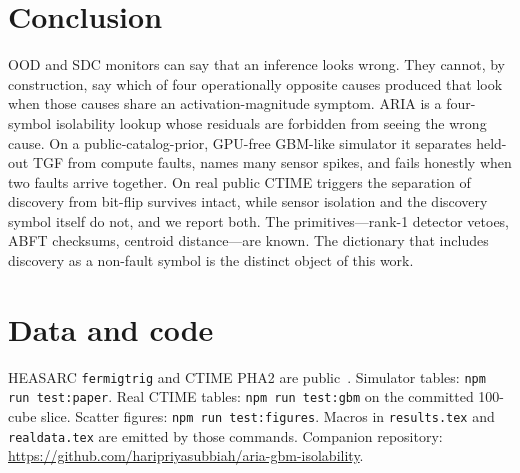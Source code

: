 \documentclass[journal]{IEEEtran}
\begin{document}
\section{Conclusion}

OOD and SDC monitors can say that an inference looks wrong. They cannot, by construction, say which of four operationally opposite causes produced that look when those causes share an activation-magnitude symptom. ARIA is a four-symbol isolability lookup whose residuals are forbidden from seeing the wrong cause. On a public-catalog-prior, GPU-free GBM-like simulator it separates held-out TGF from compute faults, names many sensor spikes, and fails honestly when two faults arrive together. On \RealCubes{} real public CTIME triggers the separation of discovery from bit-flip survives intact, while sensor isolation and the discovery symbol itself do not, and we report both. The primitives---rank-1 detector vetoes, ABFT checksums, centroid distance---are known. The dictionary that includes discovery as a non-fault symbol is the distinct object of this work.

\section*{Data and code}
HEASARC \texttt{fermigtrig} and CTIME PHA2 are public~\cite{meegan2009,vonkienlin2020}. Simulator tables: \texttt{npm run test:paper}. Real CTIME tables: \texttt{npm run test:gbm} on the committed 100-cube slice. Scatter figures: \texttt{npm run test:figures}. Macros in \texttt{results.tex} and \texttt{realdata.tex} are emitted by those commands. Companion repository: \url{https://github.com/haripriyasubbiah/aria-gbm-isolability}.
\end{document}
